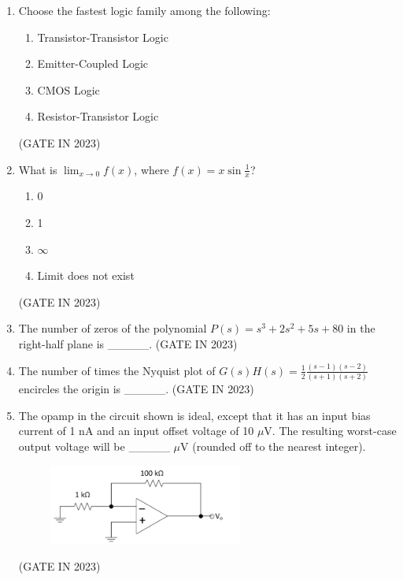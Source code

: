 \documentclass[journal]{IEEEtran}
\begin{document}
\begin{enumerate}
    \item Choose the fastest logic family among the following:
    
    \begin{enumerate}
        \item Transistor-Transistor Logic
        \item Emitter-Coupled Logic
        \item CMOS Logic
        \item Resistor-Transistor Logic
    \end{enumerate}
    \hfill(GATE IN 2023)

    \item What is $\lim_{x \to 0} f(x)$, where $f(x) = x \sin \frac{1}{x}$?
    
    \begin{enumerate}
        \item 0
        \item 1
        \item $\infty$
        \item Limit does not exist
    \end{enumerate}
    \hfill(GATE IN 2023)

    \item The number of zeros of the polynomial $P(s) = s^3 + 2s^2 + 5s + 80$ in the right-half plane is \_\_\_\_\_.
    \hfill(GATE IN 2023)

    \item The number of times the Nyquist plot of $G(s)H(s) = \frac{1}{2}\frac{(s-1)(s-2)}{(s+1)(s+2)}$ encircles the origin is \_\_\_\_\_.
   \hfill(GATE IN 2023)

    \item The opamp in the circuit shown is ideal, except that it has an input bias current of 1 nA and an input offset voltage of 10 $\mu$V. The resulting worst-case output voltage will be \_\_\_\_\_ $\mu$V (rounded off to the nearest integer).
    \begin{figure}[H]
    \centering
      \includegraphics[width=0.6\textwidth]{15.png} 
      \caption{}
    \label{fig:fig15} 
\end{figure}
\hfill(GATE IN 2023)


\end{enumerate}
\end{document}
